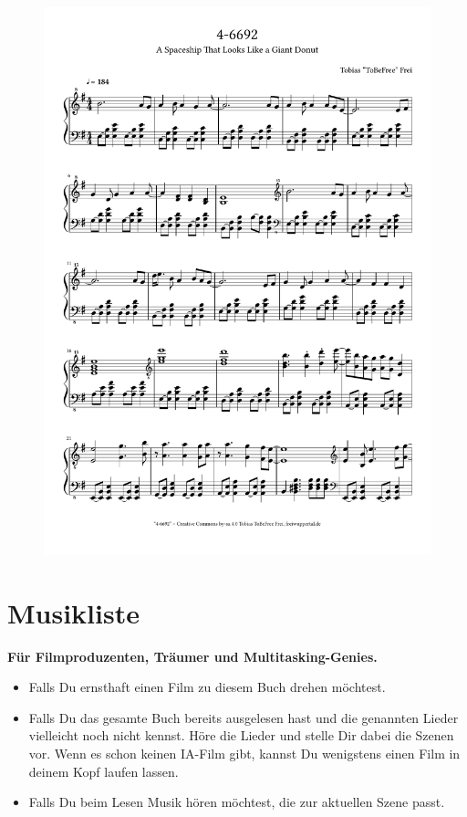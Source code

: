 \begin{figure}[p]
    \includegraphics[width=\textwidth, page=4]{z-include-ia2theme.pdf}
\end{figure}


\chapter{Musikliste}

\textbf{Für Filmproduzenten, Träumer und Multitasking-Genies.}

\begin{itemize}
    \item Falls Du ernsthaft einen Film zu diesem Buch drehen möchtest.
    \item Falls Du das gesamte Buch bereits ausgelesen hast und die genannten Lieder vielleicht noch nicht kennst. Höre die Lieder und stelle Dir dabei die Szenen vor. Wenn es schon keinen IA-Film gibt, kannst Du wenigstens einen Film in deinem Kopf laufen lassen.
    \item Falls Du beim Lesen Musik hören möchtest, die zur aktuellen Szene passt.
\end{itemize}

